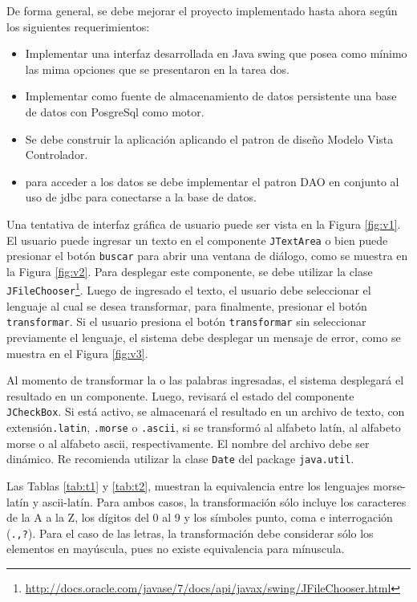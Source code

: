 \documentclass[a4paper,10pt]{article}
\theoremstyle{mytheor}
\begin{document}
De forma general, se debe mejorar el proyecto implementado hasta ahora según los siguientes requerimientos:
\begin{itemize}
    \item Implementar una interfaz desarrollada en Java swing que posea  como mínimo las mima opciones que se presentaron en la tarea dos.
    \item Implementar como fuente de almacenamiento de datos persistente una base de datos con PosgreSql como motor.
    \item Se debe construir la aplicación aplicando el patron de diseño Modelo Vista Controlador.
    \item para acceder a los datos se debe implementar el patron DAO en conjunto al uso de jdbc para conectarse a la base de datos.
    
\end{itemize}

Una tentativa de interfaz gr\'afica de usuario puede ser vista en la Figura \ref{fig:v1}. El usuario puede ingresar un texto en el componente \texttt{JTextArea} o bien puede presionar el bot\'on \texttt{buscar} para abrir una ventana de di\'alogo, como se muestra en la Figura \ref{fig:v2}. Para desplegar este componente, se debe utilizar la clase \texttt{JFileChooser}\footnote{\url{http://docs.oracle.com/javase/7/docs/api/javax/swing/JFileChooser.html}}. Luego de ingresado el texto, el usuario debe seleccionar el lenguaje al cual se desea transformar, para finalmente, presionar el bot\'on \texttt{transformar}. Si el usuario presiona el bot\'on \texttt{transformar} sin seleccionar previamente el lenguaje, el sistema debe desplegar un mensaje de error, como se muestra en el Figura \ref{fig:v3}.

Al momento de transformar la o las palabras ingresadas, el sistema desplegar\'a el resultado en un componente. Luego, revisar\'a el estado del componente \texttt{JCheckBox}. Si est\'a activo, se almacenar\'a el resultado en un archivo de texto, con extensi\'on\texttt{.latin}, \texttt{.morse} o \texttt{.ascii}, si se transform\'o al alfabeto lat\'in, al alfabeto morse o al alfabeto ascii, respectivamente. El nombre del archivo debe ser din\'amico. Re recomienda utilizar la clase \texttt{Date} del package \texttt{java.util}.

Las Tablas \ref{tab:t1} y \ref{tab:t2}, muestran la equivalencia entre los lenguajes morse-lat\'in y ascii-lat\'in. Para ambos casos, la transformaci\'on s\'olo incluye los caracteres de la A a la Z, los d\'igitos del 0 al 9 y los s\'imboles punto, coma e interrogaci\'on (\texttt{.,?}). Para el caso de las letras, la transformaci\'on debe considerar s\'olo los elementos en may\'uscula, pues no existe equivalencia para m\'inuscula. %
\end{document}
